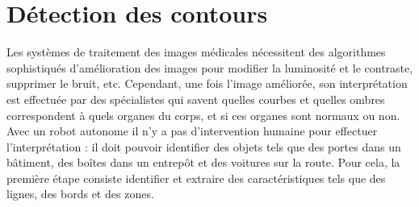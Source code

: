 \section{Détection des contours}\label{s.edge-detection}

Les systèmes de traitement des images médicales nécessitent des algorithmes sophistiqués d'amélioration des images pour modifier la luminosité et le contraste, supprimer le bruit, etc. Cependant, une fois l'image améliorée, son interprétation est effectuée par des spécialistes qui savent quelles courbes et quelles ombres correspondent à quels organes du corps, et si ces organes sont normaux ou non. Avec un robot autonome il n'y a pas d'intervention humaine pour effectuer l'interprétation : il doit pouvoir identifier des objets tels que des portes dans un bâtiment, des boîtes dans un entrepôt et des voitures sur la route. Pour cela, la première étape consiste identifier et extraire des caractéristiques tels que des lignes, des bords et des zones.

